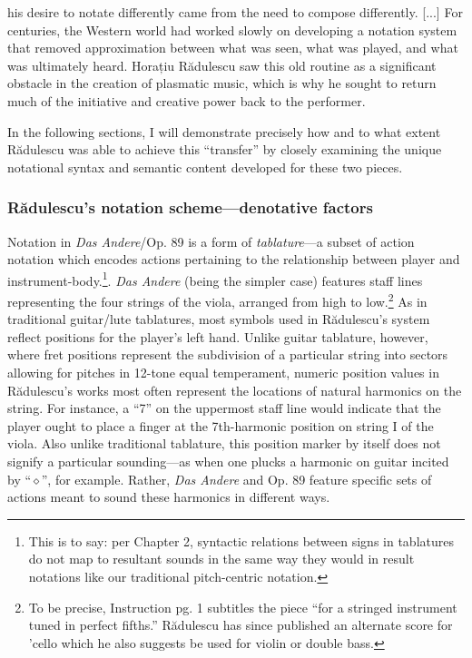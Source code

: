             \begin{smallquote}
                [...] his desire to notate differently came from the need to compose differently. [...] For centuries, the Western world had worked slowly on developing a notation system that removed approximation between what was seen, what was played, and what was ultimately heard. Horațiu Rădulescu saw this old routine as a significant obstacle in the creation of plasmatic music, which is why he sought to return much of the initiative and creative power back to the performer.\autocite[1]{Marinescu}
            \end{smallquote}

        \noindent In the following sections, I will demonstrate precisely how and to what extent R\u{a}dulescu was able to achieve this ``transfer'' by closely examining the unique notational syntax and semantic content developed for these two pieces.

    \subsubsection{Rădulescu's notation scheme---denotative factors}
        
        Notation in \textit{Das Andere}/Op. 89 is a form of \textit{tablature}---a subset of action notation which encodes actions pertaining to the relationship between player and instrument-body.\footnote{This is to say: per Chapter 2, syntactic relations between signs in tablatures do not map to resultant sounds in the same way they would in result notations like our traditional pitch-centric notation.}. \textit{Das Andere} (being the simpler case) features staff lines representing the four strings of the viola, arranged from high to low.\footnote{
            To be precise, Instruction pg. 1 subtitles the piece ``for a stringed instrument tuned in perfect fifths.'' R\u{a}dulescu has since published an alternate score for 'cello which he also suggests be used for violin or double bass.
            } 
        As in traditional guitar/lute tablatures, most symbols used in Rădulescu's system reflect positions for the player's left hand. Unlike guitar tablature, however, where fret positions represent the subdivision of a particular string into sectors allowing for pitches in 12-tone equal temperament, numeric position values in Rădulescu's works most often represent the locations of natural harmonics on the string. For instance, a ``7'' on the uppermost staff line would indicate that the player ought to place a finger at the 7th-harmonic position on string I of the viola. Also unlike traditional tablature, this position marker by itself does not signify a particular sounding---as when one plucks a harmonic on guitar incited by ``$\diamond$'', for example. Rather, \textit{Das Andere} and Op. 89 feature specific sets of actions meant to sound these harmonics in different ways. 
    
